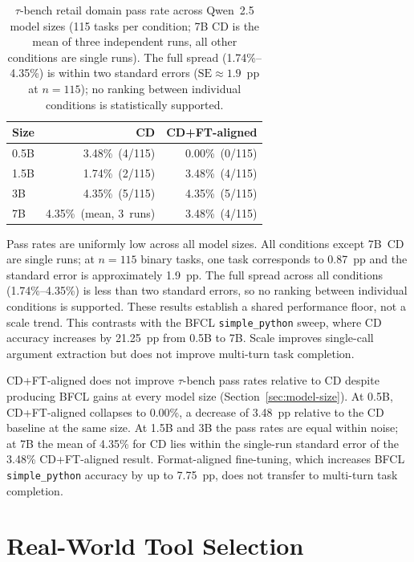 \begin{table}[ht]
\centering
\caption{$\tau$-bench retail domain pass rate across Qwen~2.5 model sizes
(115 tasks per condition; 7B CD is the mean of three independent runs,
all other conditions are single runs). The full spread (1.74\%--4.35\%)
is within two standard errors ($\mathrm{SE} \approx 1.9$~pp at $n{=}115$);
no ranking between individual conditions is statistically supported.}
\label{tab:tau-bench-size}
\begin{tabular}{lrr}
\toprule
Size & CD & CD+FT-aligned \\
\midrule
0.5B & 3.48\%\ (4/115)        & 0.00\%\ (0/115) \\
1.5B & 1.74\%\ (2/115)        & 3.48\%\ (4/115) \\
3B   & 4.35\%\ (5/115)        & 4.35\%\ (5/115) \\
7B   & 4.35\%\ (mean, 3~runs) & 3.48\%\ (4/115) \\
\bottomrule
\end{tabular}
\end{table}

Pass rates are uniformly low across all model sizes. All conditions except
7B~CD are single runs; at $n=115$ binary tasks, one task corresponds to
0.87~pp and the standard error is approximately 1.9~pp. The full spread
across all conditions (1.74\%--4.35\%) is less than two standard errors, so
no ranking between individual conditions is supported. These results establish
a shared performance floor, not a scale trend. This contrasts with the BFCL \texttt{simple\_python} sweep, where
CD accuracy increases by 21.25~pp from 0.5B to 7B. Scale improves single-call
argument extraction but does not improve multi-turn task completion.

CD+FT-aligned does not improve $\tau$-bench pass rates relative to CD despite
producing BFCL gains at every model size (Section~\ref{sec:model-size}). At
0.5B, CD+FT-aligned collapses to 0.00\%, a decrease of 3.48~pp relative to
the CD baseline at the same size. At 1.5B and 3B the pass rates are equal
within noise; at 7B the mean of 4.35\% for CD lies within the single-run
standard error of the 3.48\% CD+FT-aligned result. Format-aligned fine-tuning,
which increases BFCL \texttt{simple\_python} accuracy by up to 7.75~pp, does not
transfer to multi-turn task completion.

\section{Real-World Tool Selection}
\label{sec:github-mcp}

